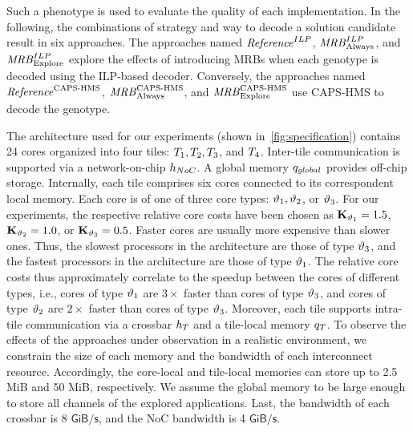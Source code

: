 Such a phenotype is used to evaluate the quality of each implementation.
In the following, the combinations of strategy and way to decode a solution candidate result in six approaches.
The approaches named ${\it Reference}^{ILP}$, ${\it MRB}_{\mathrm{Always}}^{ILP}$, and ${\it MRB}_{\mathrm{Explore}}^{ILP}$ explore the effects of introducing \acp{MRB} when each genotype is decoded using the ILP-based decoder.
Conversely, the approaches named ${\it Reference}^{\textup{{CAPS-HMS}}}$, ${\it MRB}_{\mathrm{Always}}^{\textup{{CAPS-HMS}}}$, and ${\it MRB}_{\mathrm{Explore}}^{\textup{{CAPS-HMS}}}$ use \ac{CAPS-HMS} to decode the genotype.
\par
The architecture used for our experiments (shown in~\cref{fig:specification}) contains 24 cores organized into four tiles: $T_1, T_2, T_3$, and $T_4$.
Inter-tile communication is supported via a network-on-chip $h_{NoC}$.
A global memory $q_{global}$ provides off-chip storage.
Internally, each tile comprises six cores connected to its correspondent local memory.
Each core is of one of three core types: $\vartheta_1, \vartheta_2$, or $\vartheta_3$.
For our experiments, the respective relative core costs have been chosen as $\mathbf{K}_{\vartheta_1} = 1.5$, $\mathbf{K}_{\vartheta_2} = 1.0$, or $\mathbf{K}_{\vartheta_3} = 0.5$.
Faster cores are usually more expensive than slower ones.
Thus, the slowest processors in the architecture are those of type $\vartheta_3$, and the fastest processors in the architecture are those of type $\vartheta_1$.
The relative core costs thus approximately correlate to the speedup between the cores of different types, i.e., cores of type $\vartheta_1$ are $3\times$ faster than cores of type $\vartheta_3$, and cores of type $\vartheta_2$ are $2\times$ faster than cores of type $\vartheta_3$.
Moreover, each tile supports intra-tile communication via a crossbar ${h_{T_{}}}$ and a tile-local memory $q_T$.
To observe the effects of the approaches under observation in a realistic environment, we constrain the size of each memory and the bandwidth of each interconnect resource.
Accordingly, the core-local and tile-local memories can store up to 2.5 MiB and 50 MiB, respectively.
We assume the global memory to be large enough to store all channels of the explored applications.
Last, the bandwidth of each crossbar is 8 $\mathsf{GiB/s}$, and the \ac{NoC} bandwidth is 4 $\mathsf{GiB/s}$.
\par
